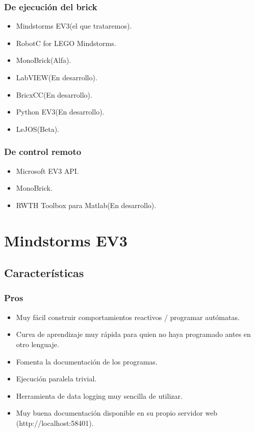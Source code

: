 \documentclass[12pt,a4paper]{article}
\begin{document}
\subsubsection{De ejecución del brick}
\begin{itemize}
\item Mindstorms EV3(el que trataremos).
\item RobotC for LEGO Mindstorms.
\item MonoBrick(Alfa).
\item LabVIEW(En desarrollo).
\item BricxCC(En desarrollo).
\item Python EV3(En desarrollo).
\item LeJOS(Beta).
\end{itemize}
\subsubsection{De control remoto}
\begin{itemize}
\item Microsoft EV3 API.
\item MonoBrick.
\item RWTH Toolbox para Matlab(En desarrollo).
\end{itemize}
\section{Mindstorms EV3}
\subsection{Características}
\subsubsection{Pros}
\begin{itemize}
\item Muy fácil construir comportamientos reactivos / programar autómatas.
\item Curva de aprendizaje muy rápida para quien no haya programado antes en
otro lenguaje.
\item Fomenta la documentación de los programas.
\item Ejecución paralela trivial.
\item Herramienta de data logging muy sencilla de utilizar.
\item Muy buena documentación disponible en su propio servidor web
(http://localhost:58401).
\end{itemize}
\end{document}
